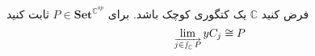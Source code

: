 فرض کنید $\mathbb{C}$ یک کتگوری کوچک باشد. برای $P \in \mathbf{Set}^{\mathbb{C}^{op}}$ ثابت کنید
\[ \lim\limits_{\overrightarrow{j \in \smallint_\mathbb{C} P}} y C_j \cong P \]